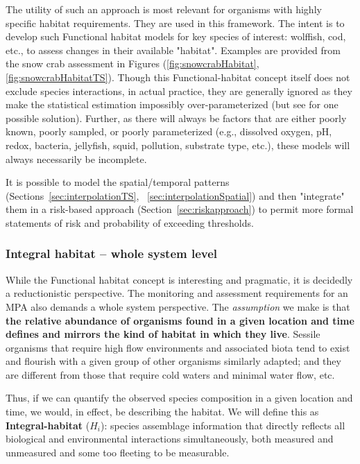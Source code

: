 \documentclass[letterpaper,portrait,11pt]{scrartcl}
\numberwithin{equation}{section}    %
\numberwithin{figure}{section}    %
\numberwithin{table}{section}       %
\begin{document}
The utility of such an approach is most relevant for organisms with highly specific habitat requirements. They are used in this framework. The intent is to develop such Functional habitat models for key species of interest: wolffish, cod, etc., to assess changes in their available "habitat". Examples are provided from the snow crab assessment in Figures (\ref{fig:snowcrabHabitat}, \ref{fig:snowcrabHabitatTS}). Though this Functional-habitat concept itself does not exclude species interactions, in actual practice, they are generally ignored as they make the statistical estimation impossibly over-parameterized (but see \cite{choi:2012:resdoc} for one possible solution). Further, as there will always be factors that are either poorly known, poorly sampled, or poorly parameterized (e.g., dissolved oxygen, pH, redox, bacteria, jellyfish, squid, pollution, substrate type, etc.), these models will always necessarily be incomplete.

It is possible to model the spatial/temporal patterns (Sections~\ref{sec:interpolationTS}, ~\ref{sec:interpolationSpatial}) and then "integrate" them in a risk-based approach (Section~\ref{sec:riskapproach}) to permit more formal statements of risk and probability of exceeding thresholds.



\subsubsection{Integral habitat -- whole system level}
\label{sec:integralHabitat}

While the Functional habitat concept is interesting and pragmatic, it is decidedly a reductionistic perspective. The monitoring and assessment requirements for an MPA also demands a whole system perspective. The \textit{assumption} we make is that \textbf{the relative abundance of organisms found in a given location and time defines and mirrors the kind of habitat in which they live}. Sessile organisms that require high flow environments and associated biota tend to exist and flourish with a given group of other organisms similarly adapted; and they are different from those that require cold waters and minimal water flow, etc.

Thus, if we can quantify the observed species composition in a given location and time, we would, in effect, be describing the habitat. We will define this as \textbf{Integral-habitat} ($H_i$): species assemblage information that directly reflects all biological and environmental interactions simultaneously, both measured and unmeasured and some too fleeting to be measurable.
\end{document}
